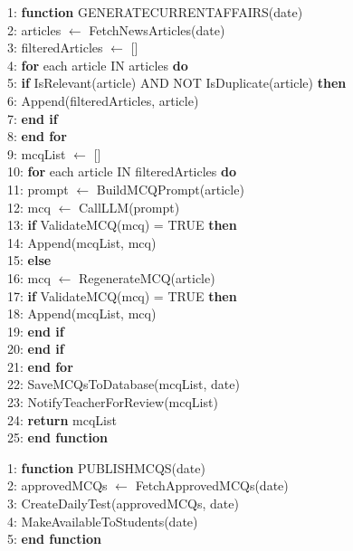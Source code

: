 \begin{sloppypar}
1: \textbf{function} GENERATECURRENTAFFAIRS(date)\\
2: \quad articles $\leftarrow$ FetchNewsArticles(date)\\
3: \quad filteredArticles $\leftarrow$ []\\
4: \quad \textbf{for} each article IN articles \textbf{do}\\
5: \qquad \textbf{if} IsRelevant(article) AND NOT IsDuplicate(article) \textbf{then}\\
6: \qquad\quad Append(filteredArticles, article)\\
7: \qquad \textbf{end if}\\
8: \quad \textbf{\textbf{end for}}\\
9: \quad mcqList $\leftarrow$ []\\
10: \quad \textbf{for} each article IN filteredArticles \textbf{do}\\
11: \qquad prompt $\leftarrow$ BuildMCQPrompt(article)\\
12: \qquad mcq $\leftarrow$ CallLLM(prompt)\\
13: \qquad \textbf{if} ValidateMCQ(mcq) = TRUE \textbf{then}\\
14: \qquad\quad Append(mcqList, mcq)\\
15: \qquad \textbf{else}\\
16: \qquad\quad mcq $\leftarrow$ RegenerateMCQ(article)\\
17: \qquad\quad \textbf{if} ValidateMCQ(mcq) = TRUE \textbf{then}\\
18: \qquad\qquad Append(mcqList, mcq)\\
19: \qquad\quad \textbf{end if}\\
20: \qquad \textbf{end if}\\
21: \quad \textbf{\textbf{end for}}\\
22: \quad SaveMCQsToDatabase(mcqList, date)\\
23: \quad NotifyTeacherForReview(mcqList)\\
24: \quad \textbf{return} mcqList\\
25: \textbf{end function}
\algofooter

1: \textbf{function} PUBLISHMCQS(date)\\
2: \quad approvedMCQs $\leftarrow$ FetchApprovedMCQs(date)\\
3: \quad CreateDailyTest(approvedMCQs, date)\\
4: \quad MakeAvailableToStudents(date)\\
5: \textbf{end function}
\algofooter


\end{sloppypar}
